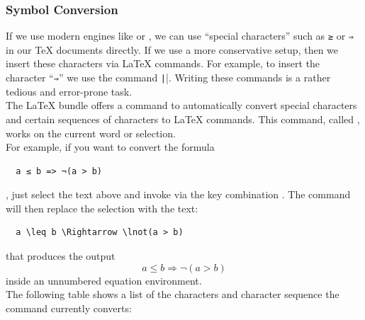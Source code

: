 \documentclass[11pt, x11names]{article}
\begin{document}
\subsubsection{Symbol Conversion}

If we use modern engines like \XeLaTeX{} or \LuaLaTeX{}, we can use “special characters” such as \texttt{≥} or \texttt{⇒} in our TeX documents directly. If we use a more conservative setup, then we insert these characters via LaTeX commands. For example, to insert the character “\texttt{⇒}” we use the command \texttt|\Rightarrow|. Writing these commands is a rather tedious and error-prone task.\\

The LaTeX bundle offers a command to automatically convert special characters and certain sequences of characters to LaTeX commands. This command, called , works on the current word or selection.\\

For example, if you want to convert the formula
\begin{verbatim}
  a ≤ b => ¬(a > b)
\end{verbatim}
, just select the text above and invoke  via the key combination \keys{\cmd + \&}. The command will then replace the selection with the text:
\begin{verbatim}
  a \leq b \Rightarrow \lnot(a > b)
\end{verbatim}
that produces the output
\[
  a \leq b \Rightarrow \lnot(a > b)
\]
inside an unnumbered equation environment.\\

The following table shows a list of the characters and character sequence the command currently converts:
\end{document}
